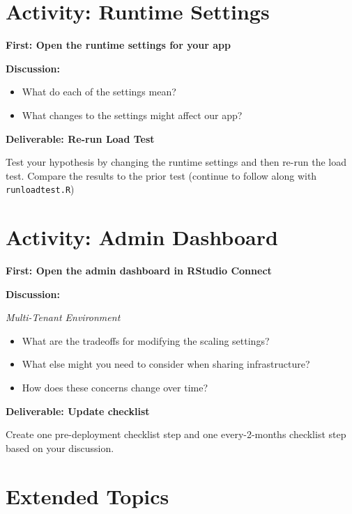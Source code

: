 \documentclass[]{book}
\providecommand{\tightlist}{%
  \setlength{\itemsep}{0pt}\setlength{\parskip}{0pt}}
\theoremstyle{definition}
\theoremstyle{definition}
\theoremstyle{definition}
\theoremstyle{remark}
\begin{document}
\hypertarget{activity-runtime-settings}{%
\section{Activity: Runtime Settings}\label{activity-runtime-settings}}

\textbf{First: Open the runtime settings for your app}

\textbf{Discussion:}

\begin{itemize}
\tightlist
\item
  What do each of the settings mean?
\item
  What changes to the settings might affect our app?
\end{itemize}

\textbf{Deliverable: Re-run Load Test}

Test your hypothesis by changing the runtime settings and then re-run
the load test. Compare the results to the prior test (continue to follow
along with \texttt{runloadtest.R})

\hypertarget{activity-admin-dashboard}{%
\section{Activity: Admin Dashboard}\label{activity-admin-dashboard}}

\textbf{First: Open the admin dashboard in RStudio Connect}

\textbf{Discussion:}

\emph{Multi-Tenant Environment}

\begin{itemize}
\tightlist
\item
  What are the tradeoffs for modifying the scaling settings?
\item
  What else might you need to consider when sharing infrastructure?
\item
  How does these concerns change over time?
\end{itemize}

\textbf{Deliverable: Update checklist}

Create one pre-deployment checklist step and one every-2-months
checklist step based on your discussion.

\hypertarget{extended-topics-1}{%
\section{Extended Topics}\label{extended-topics-1}}
\end{document}
